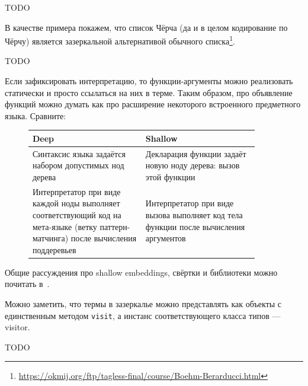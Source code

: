 TODO %

В качестве примера покажем, что список Чёрча (да и в целом кодирование по Чёрчу) является зазеркальной альтернативой обычного списка\footnote{\url{https://okmij.org/ftp/tagless-final/course/Boehm-Berarducci.html}}.

TODO %


Если зафиксировать интерпретацию, то функции-аргументы можно реализовать статически и просто ссылаться на них в терме.
Таким образом, про объявление функций можно думать как про расширение некоторого встроенного предметного языка.
Сравните:
\begin{figure}[h]
    \centering
    \begin{tabular}{|p{0.45\linewidth}|p{0.45\linewidth}|}
        \hline
        Deep                                                                                                                                 & Shallow                                                                              \\
        \hline
        Синтаксис языка задаётся набором допустимых нод дерева                                                                               & Декларация функции задаёт новую ноду дерева: вызов этой функции                      \\
        \hline
        Интерпретатор при виде каждой ноды выполняет соответствующий код на мета-языке (ветку паттерн-матчинга) после вычисления поддеревьев & Интерпретатор при виде вызова выполняет код тела функции после вычисления аргументов \\
        \hline
    \end{tabular}
\end{figure}

Общие рассуждения про shallow embeddings, свёртки и библиотеки можно почитать в~\cite{gibbons2013functional, gibbons2014folding}.

Можно заметить, что термы в зазеркалье можно представлять как объекты с единственным методом \texttt{visit}, а инстанс соответствующего класса типов --- visitor.


TODO %


